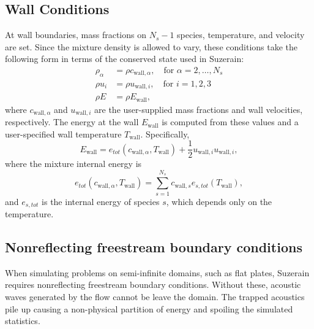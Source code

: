 

\subsection{Wall Conditions}
At wall boundaries, mass fractions on $N_s -1$ species, temperature,
and velocity are set.  Since the mixture density is allowed to vary,
these conditions take the following form in terms of the conserved
state used in Suzerain:
%
\begin{align*}
\rho_{\alpha} &= \rho c_{\mathrm{wall},\alpha}, \quad \mathrm{for} \,\, \alpha = 2, \ldots, N_s\\
\rho u_i &= \rho u_{\mathrm{wall},i}, \quad \mathrm{for} \,\, i = 1, 2, 3 \\
\rho E &= \rho E_{\mathrm{wall}},
\end{align*}
%
where $c_{\mathrm{wall},\alpha}$ and $u_{\mathrm{wall},i}$ are the user-supplied
mass fractions and wall velocities, respectively.  The energy at the
wall $E_{\mathrm{wall}}$ is computed from these values and a
user-specified wall temperature $T_{\mathrm{wall}}$.  Specifically,
%
\begin{equation*}
E_{\mathrm{wall}} = e_{tot}(c_{\mathrm{wall},\alpha}, T_{\mathrm{wall}}) + \frac{1}{2} u_{\mathrm{wall},i} u_{\mathrm{wall},i},
\end{equation*}
%
where the mixture internal energy is
%
\begin{equation*}
e_{tot}(c_{\mathrm{wall},\alpha}, T_{\mathrm{wall}}) = \sum_{s=1}^{N_s} c_{\mathrm{wall},s} e_{s,tot}(T_{\mathrm{wall}}),
\end{equation*}
%
and $e_{s,tot}$ is the internal energy of species $s$, which depends
only on the temperature.  


\subsection{Nonreflecting freestream boundary conditions}
\label{sec:nonreflectingbcs}


When simulating problems on semi-infinite domains, such as flat plates,
Suzerain requires nonreflecting freestream boundary conditions.  Without these,
acoustic waves generated by the flow cannot be leave the domain.   The trapped
acoustics pile up causing a non-physical partition of energy and spoiling the
simulated statistics.

